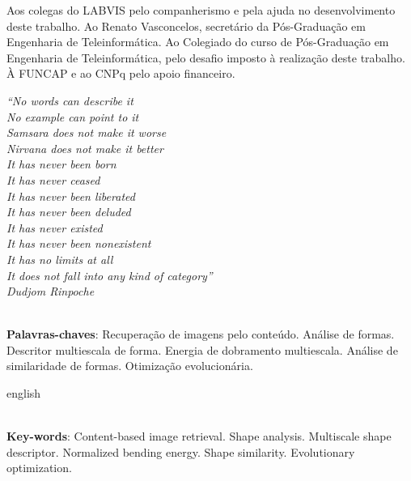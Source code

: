 \documentclass[
	12pt,				%
	openright,			%
	twoside,			%
	a4paper,			%
	english,			%
  	brazil				%
	]{abntex2}
\begin{document}
\begin{agradecimentos}
Aos colegas do LABVIS pelo companherismo e pela ajuda no desenvolvimento deste trabalho.
Ao Renato Vasconcelos, secretário da Pós-Graduação em Engenharia de Teleinformática.
Ao Colegiado do curso de Pós-Graduação em Engenharia de Teleinformática, pelo desafio imposto à realização deste trabalho.
À FUNCAP e ao CNPq pelo apoio financeiro.
\end{agradecimentos}

\begin{epigrafe}
    \vspace*{\fill}
	\begin{flushright}
		\textit{``No words can describe it\\
    No example can point to it\\
    Samsara does not make it worse\\
    Nirvana does not make it better\\
    It has never been born\\
    It has never ceased\\
    It has never been liberated\\
    It has never been deluded\\
    It has never existed\\
    It has never been nonexistent\\
    It has no limits at all\\
    It does not fall into any kind of category''\\
	Dudjom Rinpoche}
	\end{flushright}
\end{epigrafe}


\setlength{\absparsep}{18pt} %
\begin{resumo}

\vspace{\onelineskip}
\noindent\\ 
\textbf{Palavras-chaves}: 
 Recuperação de imagens pelo conteúdo. Análise de formas. Descritor multiescala de forma. Energia de dobramento multiescala. Análise de similaridade de formas. Otimização evolucionária.  
\end{resumo}

\begin{resumo}[Abstract]
\begin{otherlanguage*}{english}
 
\vspace{\onelineskip}
\noindent\\ 
\textbf{Key-words}: 
Content-based image retrieval. Shape analysis. Multiscale shape descriptor. Normalized bending energy. Shape similarity.  Evolutionary optimization.  
 \end{otherlanguage*}
\end{resumo}
\end{document}

